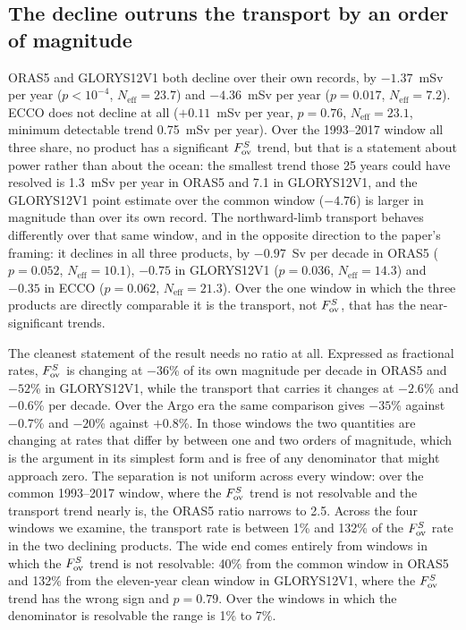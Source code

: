 \subsection*{The decline outruns the transport by an order of magnitude}

ORAS5 and GLORYS12V1 both decline over their own records, by $-1.37$~mSv per
year ($p<10^{-4}$, $N_{\text{eff}}=23.7$) and $-4.36$~mSv per year
($p=0.017$, $N_{\text{eff}}=7.2$). ECCO does not decline at all
($+0.11$~mSv per year, $p=0.76$, $N_{\text{eff}}=23.1$, minimum detectable
trend 0.75~mSv per year). Over the 1993--2017 window all three share, no
product has a significant \emph{$F_{\mathrm{ov}}^{S}$} trend, but that is a statement about
power rather than about the ocean: the smallest trend those 25 years could have
resolved is 1.3~mSv per year in ORAS5 and 7.1 in GLORYS12V1, and the GLORYS12V1
point estimate over the common window ($-4.76$) is larger in magnitude than over
its own record. The northward-limb transport behaves differently over that same
window, and in the opposite direction to the paper's framing: it declines in all
three products, by $-0.97$~Sv per decade in ORAS5 ($p=0.052$,
$N_{\text{eff}}=10.1$), $-0.75$ in GLORYS12V1 ($p=0.036$, $N_{\text{eff}}=14.3$)
and $-0.35$ in ECCO ($p=0.062$, $N_{\text{eff}}=21.3$). Over the one window in
which the three products are directly comparable it is the transport, not
$F_{\mathrm{ov}}^{S}$, that has the near-significant trends.

The cleanest statement of the result needs no ratio at all. Expressed as
fractional rates, $F_{\mathrm{ov}}^{S}$ is changing at $-36$\% of its own magnitude per decade
in ORAS5 and $-52$\% in GLORYS12V1, while the transport that carries it changes
at $-2.6$\% and $-0.6$\% per decade. Over the Argo era the same comparison gives
$-35$\% against $-0.7$\% and $-20$\% against $+0.8$\%. In those windows the two quantities are
changing at rates that differ by between one and two orders of magnitude, which
is the argument in its simplest form and is free of any denominator that might
approach zero. The separation is not uniform across every window: over the
common 1993--2017 window, where the $F_{\mathrm{ov}}^{S}$ trend is not resolvable and the
transport trend nearly is, the ORAS5 ratio narrows to 2.5. Across the four
windows we examine, the transport rate is between 1\% and 132\% of the $F_{\mathrm{ov}}^{S}$
rate in the two declining products. The wide end comes entirely from windows in
which the $F_{\mathrm{ov}}^{S}$ trend is not resolvable: 40\% from the common window in
ORAS5 and 132\% from the eleven-year clean window in GLORYS12V1, where the
$F_{\mathrm{ov}}^{S}$ trend has the wrong sign and $p=0.79$. Over the windows in which the
denominator is resolvable the range is 1\% to 7\%.

